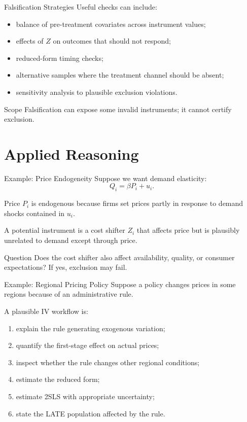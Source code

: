 \documentclass[aspectratio=169,11pt]{beamer}
\begin{document}
\begin{frame}{Falsification Strategies}
Useful checks can include:
\begin{itemize}
\item balance of pre-treatment covariates across instrument values;
\item effects of \(Z\) on outcomes that should not respond;
\item reduced-form timing checks;
\item alternative samples where the treatment channel should be absent;
\item sensitivity analysis to plausible exclusion violations.
\end{itemize}

\begin{alertblock}{Scope}
Falsification can expose some invalid instruments; it cannot certify exclusion.
\end{alertblock}
\end{frame}

\section{Applied Reasoning}

\begin{frame}{Example: Price Endogeneity}
Suppose we want demand elasticity:
\[
Q_i=\beta P_i+u_i.
\]

Price \(P_i\) is endogenous because firms set prices partly in response to demand shocks contained in \(u_i\).

A potential instrument is a cost shifter \(Z_i\) that affects price but is plausibly unrelated to demand except through price.

\begin{block}{Question}
Does the cost shifter also affect availability, quality, or consumer expectations? If yes, exclusion may fail.
\end{block}
\end{frame}

\begin{frame}{Example: Regional Pricing Policy}
Suppose a policy changes prices in some regions because of an administrative rule.

A plausible IV workflow is:
\begin{enumerate}
\item explain the rule generating exogenous variation;
\item quantify the first-stage effect on actual prices;
\item inspect whether the rule changes other regional conditions;
\item estimate the reduced form;
\item estimate 2SLS with appropriate uncertainty;
\item state the LATE population affected by the rule.
\end{enumerate}
\end{frame}
\end{document}
